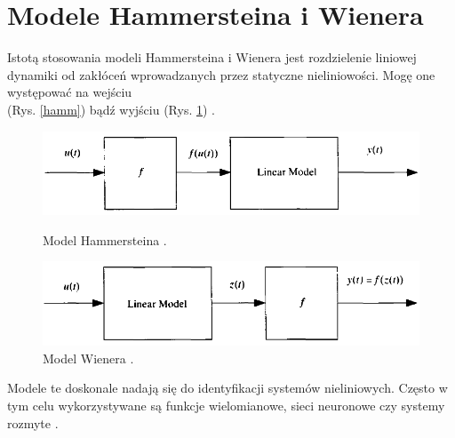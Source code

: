 \section{Modele Hammersteina i Wienera}
Istotą stosowania modeli Hammersteina i Wienera jest rozdzielenie liniowej dynamiki od zakłóceń wprowadzanych przez statyczne nieliniowości. Mogę one występować na wejściu \\ (Rys. \ref{hamm}) bądź wyjściu (Rys. \ref{wien}) \cite{10}.
\vspace{0.5cm}
\begin{figure}[h!]
\centering
\includegraphics[width=\textwidth]{pictures/hammerstein}
\caption{Model Hammersteina \cite{21}.}
\label{hamm}

\vspace{0.5cm}

\includegraphics[width=\textwidth]{pictures/wiener}
\caption{Model Wienera \cite{21}.}
\label{wien}
\end{figure}

Modele te doskonale nadają się do identyfikacji systemów nieliniowych. Często w tym celu wykorzystywane są funkcje wielomianowe, sieci neuronowe czy systemy rozmyte \cite{150}.